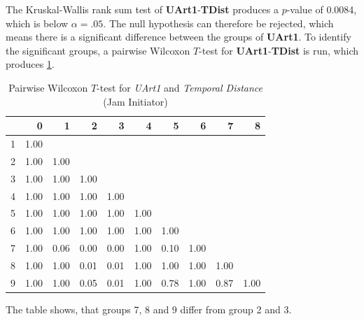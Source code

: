 The Kruskal-Wallis rank sum test of \textbf{UArt1}-\textbf{TDist} produces a $p$-value of 0.0084, which is below $\alpha=.05$. The null hypothesis can therefore be rejected, which means there is a significant difference between the groups of \textbf{UArt1}. To identify the significant groups, a pairwise Wilcoxon $T$-test for \textbf{UArt1}-\textbf{TDist} is run, which produces \cref{tbl:wilcoxon_baysis_initiator_UArt_TDist}. 
\begin{table}[ht]
	\tiny
	\centering
    \begin{tabular}{rrrrrrrrrr}
        \toprule
        & 0 & 1 & 2 & 3 & 4 & 5 & 6 & 7 & 8 \\ 
        \midrule
        1 & 1.00 &  &  &  &  &  &  &  &  \\ 
        2 & 1.00 & 1.00 &  &  &  &  &  &  &  \\ 
        3 & 1.00 & 1.00 & 1.00 &  &  &  &  &  &  \\ 
        4 & 1.00 & 1.00 & 1.00 & 1.00 &  &  &  &  &  \\ 
        5 & 1.00 & 1.00 & 1.00 & 1.00 & 1.00 &  &  &  &  \\ 
        6 & 1.00 & 1.00 & 1.00 & 1.00 & 1.00 & 1.00 &  &  &  \\ 
        7 & 1.00 & 0.06 & 0.00 & 0.00 & 1.00 & 0.10 & 1.00 &  &  \\ 
        8 & 1.00 & 1.00 & 0.01 & 0.01 & 1.00 & 1.00 & 1.00 & 1.00 &  \\ 
        9 & 1.00 & 1.00 & 0.05 & 0.01 & 1.00 & 0.78 & 1.00 & 0.87 & 1.00 \\ 
        \bottomrule
      \end{tabular}
    \caption{Pairwise Wilcoxon $T$-test for \textit{UArt1} and \textit{Temporal Distance} (Jam Initiator)}
    \label{tbl:wilcoxon_baysis_initiator_UArt_TDist}
\end{table}
The table shows, that groups 7, 8 and 9 differ from group 2 and 3.
